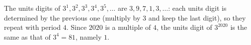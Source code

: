 The units digits of $3^1,3^2,3^3,3^4,3^5,\dots$ are $3,9,7,1,3,\dots$: each units digit is determined by the previous one (multiply by $3$ and keep the last digit), so they repeat with period $4$. Since $2020$ is a multiple of $4$, the units digit of $3^{2020}$ is the same as that of $3^4=81$, namely $\boxed{1}$.
